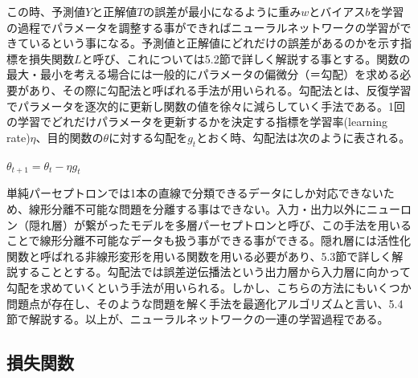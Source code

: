 \documentclass{report}
\begin{document}
この時、予測値\begin{math}Y\end{math}と正解値\begin{math}T\end{math}の誤差が最小になるように重み\begin{math}w\end{math}とバイアス\begin{math}b\end{math}を学習の過程でパラメータを調整する事ができればニューラルネットワークの学習ができているという事になる。予測値と正解値にどれだけの誤差があるのかを示す指標を損失関数\begin{math}L\end{math}と呼び、これについては5.2節で詳しく解説する事とする。関数の最大・最小を考える場合には一般的にパラメータの偏微分（＝勾配）を求める必要があり、その際に勾配法と呼ばれる手法が用いられる。勾配法とは、反復学習でパラメータを逐次的に更新し関数の値を徐々に減らしていく手法である。1回の学習でどれだけパラメータを更新するかを決定する指標を学習率(learning rate)\begin{math}\eta\end{math}、目的関数の\begin{math}\theta\end{math}に対する勾配を\begin{math}g_t\end{math}とおく時、勾配法は次のように表される。

\begin{center}
\begin{math}
\theta_{t+1} = \theta_t - \eta g_t
\end{math}
\end{center}

単純パーセプトロンでは1本の直線で分類できるデータにしか対応できないため、線形分離不可能な問題を分離する事はできない。入力・出力以外にニューロン（隠れ層）が繋がったモデルを多層パーセプトロンと呼び、この手法を用いることで線形分離不可能なデータも扱う事ができる事ができる。隠れ層には活性化関数と呼ばれる非線形変形を用いる関数を用いる必要があり、5.3節で詳しく解説することとする。勾配法では誤差逆伝播法という出力層から入力層に向かって勾配を求めていくという手法が用いられる。しかし、こちらの方法にもいくつか問題点が存在し、そのような問題を解く手法を最適化アルゴリズムと言い、5.4節で解説する。以上が、ニューラルネットワークの一連の学習過程である。


\subsection{損失関数}
\end{document}
